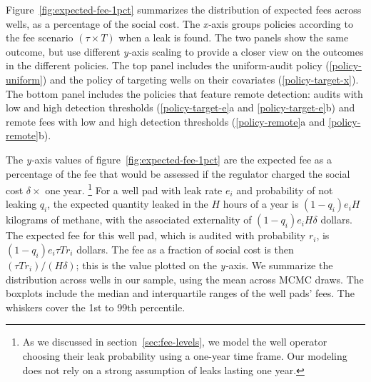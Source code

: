 Figure~\ref{fig:expected-fee-1pct} summarizes the distribution of expected fees across wells, as a percentage of the social cost.
The \textit{x-}axis groups policies according to the fee scenario \((\tau \times T)\) when a leak is found.
The two panels show the same outcome, but use different \textit{y-}axis scaling to provide a closer view on the outcomes in the different policies.
The top panel includes the uniform-audit policy (\ref{policy-uniform}) and the policy of targeting wells on their covariates (\ref{policy-target-x}).
The bottom panel includes the policies that feature remote detection: audits with low and high detection thresholds (\ref{policy-target-e}a and \ref{policy-target-e}b) and remote fees with low and high detection thresholds (\ref{policy-remote}a and \ref{policy-remote}b).

The \textit{y-}axis values of figure~\ref{fig:expected-fee-1pct} are the expected fee as a percentage of the fee that would be assessed if the regulator charged the social cost \(\delta \times\) one year.%
\footnote{%
As we discussed in section~\ref{sec:fee-levels},
we model the well operator choosing their leak probability using a one-year time frame.
Our modeling does not rely on a strong assumption of leaks lasting one year.
}
For a well pad with leak rate \(e_i\) and probability of not leaking \(q_i\), the expected quantity leaked in the \(H\) hours of a year is
\((1 - q_i) e_i H\) kilograms of methane,
with the associated externality of
\((1 - q_i) e_i H \delta\) dollars.
The expected fee for this well pad, which is audited with probability \(r_i\), is
\((1 - q_i)  e_i \tau  T  r_i\) dollars.
The fee as a fraction of social cost is then
\((\tau  T  r_i ) / (H \delta)\);
this is the value plotted on the \textit{y-}axis.
We summarize the distribution across wells in our sample, using the mean across \gls{MCMC} draws.
The boxplots include the median and interquartile ranges of the well pads' fees.
The whiskers cover the 1st to 99th percentile.

